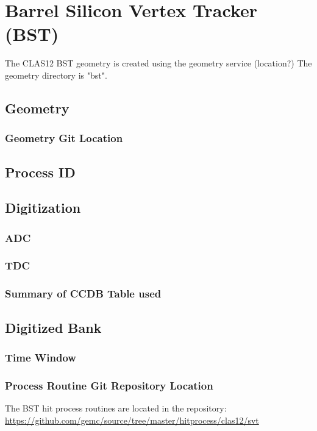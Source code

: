 \section{Barrel Silicon Vertex Tracker (BST)}

The CLAS12 BST geometry is created using the geometry service (location?)
The geometry directory is "bst".


\subsection{Geometry}

\subsubsection{Geometry Git Location}

\subsection{Process ID}

\subsection{Digitization}


\subsubsection{ADC}
\subsubsection{TDC}

\subsubsection{Summary of CCDB Table used}

\subsection{Digitized Bank}

\subsubsection{Time Window}

\subsubsection{Process Routine Git Repository Location}


The BST hit process routines are located in the repository: \url{https://github.com/gemc/source/tree/master/hitprocess/clas12/svt}
